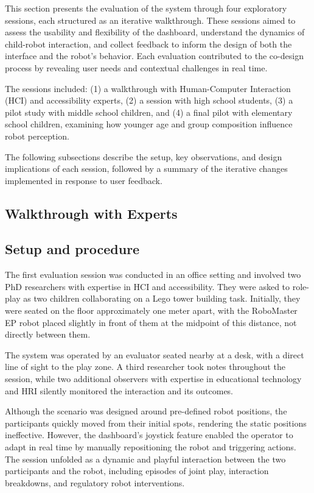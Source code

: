 \documentclass[a4paper]{usiinfbachelorproject}
\begin{document}
This section presents the evaluation of the system through four exploratory sessions, each structured as an iterative walkthrough.
These sessions aimed to assess the usability and flexibility of the dashboard, understand the dynamics of child-robot interaction, and collect feedback to inform the design of both the interface and the robot's behavior.
Each evaluation contributed to the co-design process by revealing user needs and contextual challenges in real time.

The sessions included:
(1) a walkthrough with Human-Computer Interaction (HCI) and accessibility experts,
(2) a session with high school students,
(3) a pilot study with middle school children, and
(4) a final pilot with elementary school children, examining how younger age and group composition influence robot perception.

The following subsections describe the setup, key observations, and design implications of each session, followed by a summary of the iterative changes implemented in response to user feedback.


\subsection{\textbf{Walkthrough with Experts}}\label{sec:expert-walkthrough}
\subsection*{\textbf{Setup and procedure}}
The first evaluation session was conducted in an office setting and involved two PhD researchers with expertise in HCI and accessibility.
They were asked to role-play as two children collaborating on a Lego tower building task.
Initially, they were seated on the floor approximately one meter apart, with the RoboMaster EP robot placed slightly in front of them at the midpoint of this distance, not directly between them.

The system was operated by an evaluator seated nearby at a desk, with a direct line of sight to the play zone.
A third researcher took notes throughout the session, while two additional observers with expertise in educational technology and HRI silently monitored the interaction and its outcomes.

Although the scenario was designed around pre-defined robot positions, the participants quickly moved from their initial spots, rendering the static positions ineffective.
However, the dashboard's joystick feature enabled the operator to adapt in real time by manually repositioning the robot and triggering actions.
The session unfolded as a dynamic and playful interaction between the two participants and the robot, including episodes of joint play, interaction breakdowns, and regulatory robot interventions.
\end{document}
